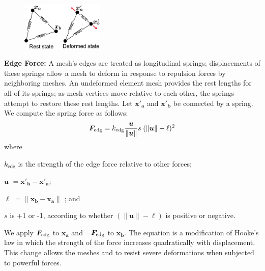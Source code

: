 \begin{figure}
\vspace{-15pt}
    \includegraphics[width=0.35\textwidth]{figures/repulsionpak/edge_forces.pdf}
\end{figure}
\textbf{Edge Force:} 
A mesh's edges are treated as longitudinal springs;
displacements of these springs allow a mesh to deform in response to repulsion forces
by neighboring meshes.
An undeformed element mesh provides the rest lengths for all of
its springs; as mesh vertices move relative to each other, the springs
attempt to restore these rest lengths.  Let $\bm{x'_{a}}$ and $\bm{x'_{b}}$ be
 connected by a spring.  We compute the spring force as follows:
\begin{equation}
\label{eq_edge_force}
\bm{F}_\mathrm{edg} =  k_\mathrm{edg} \frac{\bm{u}}{\| \bm{u} \|} s \; ( \| \bm{u} \| - \ell)^2
\end{equation}
where
\begin{packeddescriptions}
	\item[$k_\mathrm{edg}$] is the strength of the edge force relative to other forces;
	\item[$\bm{u}$] $= \bm{x'_{b}} - \bm{x'_{a}}$;
	\item[$\ell$] $= \|\bm{x_{b}} - \bm{x_{a}}\|$ ; and
	\item[$s$] is +1 or -1, according to whether $(\| \bm{u} \| - \ell)$ 
		is positive or negative.
\end{packeddescriptions}


We apply $\bm{F}_\mathrm{edg}$ to $\bm{x_{a}}$ and $-\bm{F}_\mathrm{edg}$ to $\bm{x_{b}}$.
The equation is a modification of Hooke's law
in which the strength of the force increases quadratically with displacement.
This change allows the meshes  and 
to resist severe deformations when subjected to powerful forces.



